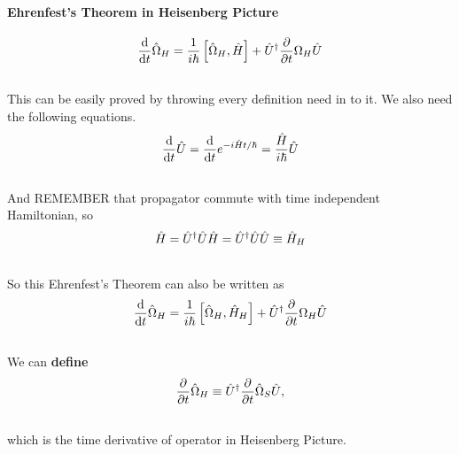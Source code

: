 \documentclass[letterpaper,10pt,english]{sphinxmanual}
\def\d{{\rm d}}
\begin{document}
\paragraph{Ehrenfest's Theorem in Heisenberg Picture}
\label{QuantumMechanics:ehrenfest-s-theorem-in-heisenberg-picture}\begin{gather}
\begin{split}\frac{\d }{\d t} \hat \Omega _ H = \frac{1}{i\hbar } \left[ \hat \Omega _ H, \hat H \right] + \hat U ^ \dagger \frac{\partial }{\partial t} \Omega _ H \hat U\end{split}\notag\\\begin{split}\end{split}\notag
\end{gather}
This can be easily proved by throwing every definition need in to it. We also need the following equations.
\begin{gather}
\begin{split}\frac{\d }{\d t} \hat U = \frac{\d }{\d t} e^{-i\hat H t /\hbar} = \frac{\hat H}{i\hbar} \hat U\end{split}\notag\\\begin{split}\end{split}\notag
\end{gather}
And REMEMBER that propagator commute with time independent Hamiltonian, so
\begin{gather}
\begin{split}\hat H = \hat U^\dagger \hat U \hat H = \hat U^ \dagger \hat U \hat U \equiv \hat H _ H\end{split}\notag\\\begin{split}\end{split}\notag
\end{gather}
So this Ehrenfest's Theorem can also be written as
\begin{gather}
\begin{split}\frac{\d }{\d t} \hat \Omega _ H = \frac{1}{i\hbar } \left[ \hat \Omega _ H, \hat H _ H \right] + \hat U ^ \dagger \frac{\partial }{\partial t} \Omega _ H \hat U\end{split}\notag\\\begin{split}\end{split}\notag
\end{gather}
We can \textbf{define}
\begin{gather}
\begin{split}\frac{\partial}{\partial t}\hat  \Omega _ H \equiv \hat U^\dagger  \frac{\partial }{\partial t}\hat  \Omega _ S \hat U  ,\end{split}\notag\\\begin{split}\end{split}\notag
\end{gather}
which is the time derivative of operator in Heisenberg Picture.
\end{document}
